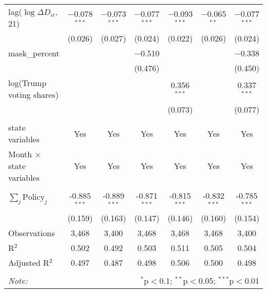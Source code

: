 \begin{tabular}{@{\extracolsep{1pt}}lcccccc}
  lag($\log \Delta D_{it}$, 21) & $-$0.078$^{***}$ & $-$0.073$^{***}$ & $-$0.077$^{***}$ & $-$0.093$^{***}$ & $-$0.065$^{**}$ & $-$0.077$^{***}$ \\ 
  & (0.026) & (0.027) & (0.024) & (0.022) & (0.026) & (0.024) \\ 
  mask\_percent &  &  & $-$0.510 &  &  & $-$0.338 \\ 
  &  &  & (0.476) &  &  & (0.450) \\ 
  log(Trump voting shares) &  &  &  & 0.356$^{***}$ &  & 0.337$^{***}$ \\ 
  &  &  &  & (0.073) &  & (0.077) \\ 
 \hline \\[-1.8ex] 
state variables & Yes & Yes & Yes & Yes & Yes & Yes \\ 
Month $\times$ state variables & Yes & Yes & Yes & Yes & Yes & Yes \\ 
\hline \\[-1.8ex] 
$\sum_j \mathrm{Policy}_j$ & -0.885$^{***}$ & -0.889$^{***}$ & -0.871$^{***}$ & -0.815$^{***}$ & -0.832$^{***}$ & -0.785$^{***}$ \\ 
 & (0.159) & (0.163) & (0.147) & (0.146) & (0.160) & (0.154) \\ 
Observations & 3,468 & 3,400 & 3,468 & 3,468 & 3,468 & 3,400 \\ 
R$^{2}$ & 0.502 & 0.492 & 0.503 & 0.511 & 0.505 & 0.504 \\ 
Adjusted R$^{2}$ & 0.497 & 0.487 & 0.498 & 0.506 & 0.500 & 0.498 \\ 
\hline 
\hline \\[-1.8ex] 
\textit{Note:}  & \multicolumn{6}{r}{$^{*}$p$<$0.1; $^{**}$p$<$0.05; $^{***}$p$<$0.01} \\ 
\end{tabular} 